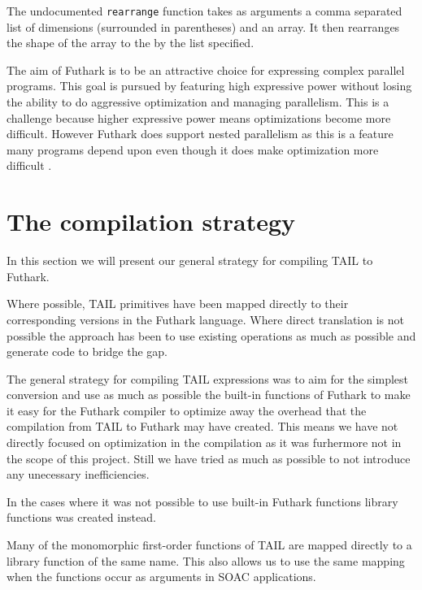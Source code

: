 \documentclass[11pt]{article}
\begin{document}
The undocumented {\tt rearrange} function takes as arguments a comma separated list of dimensions (surrounded in parentheses) and an array. It then rearranges the shape of the array to the by the list specified.

The aim of Futhark is to be an attractive choice for expressing complex parallel programs.
This goal is pursued by featuring high expressive power without
losing the ability to do aggressive optimization and managing parallelism.
This is a challenge because higher expressive power means optimizations become more difficult. 
However Futhark does support nested parallelism as this is a feature many programs 
depend upon even though it does make optimization more difficult \cite{TroelsHenriksen}.




\section{The compilation strategy}
\label{sec:strategy}
In this section we will present our general strategy for compiling TAIL to Futhark. 

Where possible, TAIL primitives have been mapped directly to their corresponding versions in the Futhark language.
Where direct translation is not possible the approach has been to use existing operations as much
as possible and generate code to bridge the gap.

The general strategy for compiling TAIL expressions was to aim for the simplest conversion and use as much as possible 
the built-in functions of Futhark to make it easy for the Futhark compiler to optimize away the overhead that the compilation from TAIL to Futhark may have created.
This means we have not directly focused on optimization in the compilation as it was furhermore not in the scope of this project.
Still we have tried as much as possible to not introduce any unecessary inefficiencies.

In the cases where it was not possible to use built-in Futhark functions library functions was created instead. 

Many of the monomorphic first-order functions of TAIL are mapped directly to a library function of the same name. This also allows us to use the same mapping when the functions occur as arguments in SOAC applications.
\end{document}
